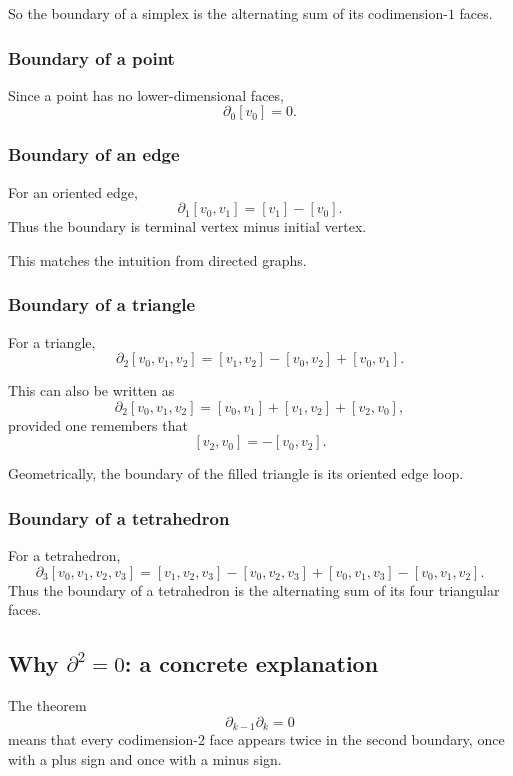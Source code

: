 \documentclass[12pt,a4paper]{article}
\theoremstyle{notespace}
\begin{document}
So the boundary of a simplex is the alternating sum of its codimension-\(1\) faces.

\subsubsection{Boundary of a point}

Since a point has no lower-dimensional faces,
\[
\partial_0[v_0]=0.
\]

\subsubsection{Boundary of an edge}

For an oriented edge,
\[
\partial_1[v_0,v_1]=[v_1]-[v_0].
\]
Thus the boundary is terminal vertex minus initial vertex.

This matches the intuition from directed graphs.

\subsubsection{Boundary of a triangle}

For a triangle,
\[
\partial_2[v_0,v_1,v_2]
=
[v_1,v_2]-[v_0,v_2]+[v_0,v_1].
\]

This can also be written as
\[
\partial_2[v_0,v_1,v_2]
=
[v_0,v_1]+[v_1,v_2]+[v_2,v_0],
\]
provided one remembers that
\[
[v_2,v_0]=-[v_0,v_2].
\]

Geometrically, the boundary of the filled triangle is its oriented edge loop.

\subsubsection{Boundary of a tetrahedron}

For a tetrahedron,
\[
\partial_3[v_0,v_1,v_2,v_3]
=
[v_1,v_2,v_3]
-
[v_0,v_2,v_3]
+
[v_0,v_1,v_3]
-
[v_0,v_1,v_2].
\]
Thus the boundary of a tetrahedron is the alternating sum of its four triangular faces.

\subsection{Why \texorpdfstring{$\partial^2=0$}{d squared = 0}: a concrete explanation}

The theorem
\[
\partial_{k-1}\partial_k = 0
\]
means that every codimension-\(2\) face appears twice in the second boundary, once with a plus sign and once with a minus sign.
\end{document}
